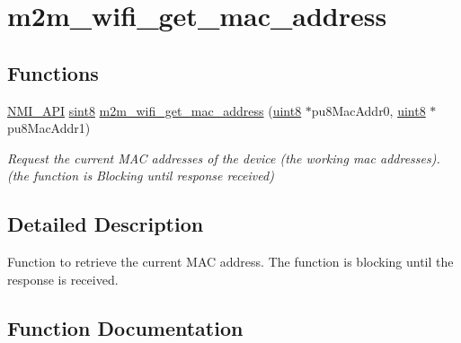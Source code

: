 \hypertarget{group__WifiGetMacAddFn}{}\section{m2m\+\_\+wifi\+\_\+get\+\_\+mac\+\_\+address}
\label{group__WifiGetMacAddFn}
\subsection*{Functions}
\begin{DoxyCompactItemize}
\item 
\hyperlink{group__BSPDefine_gaecc0323d771e41ef81a76b5f12783e22}{N\+M\+I\+\_\+\+A\+PI} \hyperlink{group__DataT_gae35f10ffd0ac8dd2bc3e794da9bdfbc7}{sint8} \hyperlink{group__WifiGetMacAddFn_gac091fddf2dfe77d8674803d0a4588408}{m2m\+\_\+wifi\+\_\+get\+\_\+mac\+\_\+address} (\hyperlink{group__DataT_ga4df709a77647e870bbf1d955b8edc9a6}{uint8} $\ast$pu8\+Mac\+Addr0, \hyperlink{group__DataT_ga4df709a77647e870bbf1d955b8edc9a6}{uint8} $\ast$pu8\+Mac\+Addr1)
\begin{DoxyCompactList}\small\item\em Request the current M\+AC addresses of the device (the working mac addresses). (the function is Blocking until response received) \end{DoxyCompactList}\end{DoxyCompactItemize}


\subsection{Detailed Description}
Function to retrieve the current M\+AC address. The function is blocking until the response is received. 

\subsection{Function Documentation}
\mbox{\label{group__WifiGetMacAddFn_gac091fddf2dfe77d8674803d0a4588408}} 
